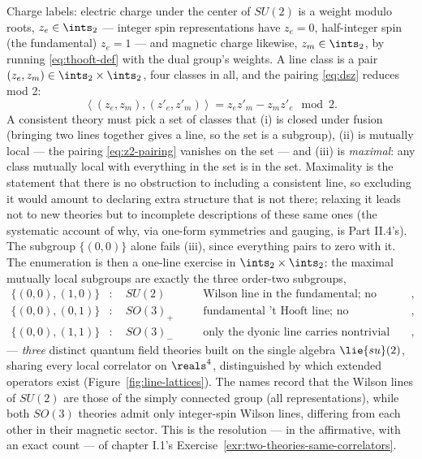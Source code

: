 Charge labels: electric charge under the center of $SU(2)$ is a weight
modulo roots, $z_e \in \ints_2$ --- integer spin representations have
$z_e = 0$, half-integer spin (the fundamental) $z_e = 1$ --- and
magnetic charge likewise, $z_m \in \ints_2$, by running
\eqref{eq:thooft-def} with the dual group's weights. A line class is a
pair $(z_e, z_m) \in \ints_2 \times \ints_2$, four classes in all, and
the pairing \eqref{eq:dsz} reduces mod 2:
\begin{equation}
\left\langle (z_e, z_m), (z'_e, z'_m)\right\rangle
= z_e z'_m - z_m z'_e \mod 2 .
\label{eq:z2-pairing}
\end{equation}
A consistent theory must pick a set of classes that (i) is closed under
fusion (bringing two lines together gives a line, so the set is a
subgroup), (ii) is mutually local --- the pairing
\eqref{eq:z2-pairing} vanishes on the set --- and (iii) is
\emph{maximal}: any class mutually local with everything in the set is
in the set. Maximality is the statement that there is no obstruction to
including a consistent line, so excluding it would amount to declaring
extra structure that is not there; relaxing it leads not to new theories
but to incomplete descriptions of these same ones (the systematic
account of why, via one-form symmetries and gauging, is Part II.4's).
The subgroup $\{(0,0)\}$ alone fails (iii), since everything pairs to
zero with it. The enumeration is then a one-line exercise in
$\ints_2\times\ints_2$: the maximal mutually local subgroups are exactly
the three order-two subgroups,
\begin{equation}
\begin{aligned}
\{(0,0), (1,0)\} &: \quad SU(2) \quad
&&\text{Wilson line in the fundamental; no fundamental 't Hooft line},\\
\{(0,0), (0,1)\} &: \quad SO(3)_+ \quad
&&\text{fundamental 't Hooft line; no fundamental Wilson line},\\
\{(0,0), (1,1)\} &: \quad SO(3)_- \quad
&&\text{only the dyonic line carries nontrivial charge},
\end{aligned}
\label{eq:three-theories}
\end{equation}
--- \emph{three} distinct quantum field theories built on the single
algebra $\lie{su}(2)$, sharing every local correlator on $\reals^4$,
distinguished by which extended operators exist
(Figure~\ref{fig:line-lattices}). The names record that the Wilson lines
of $SU(2)$ are those of the simply connected group (all
representations), while both $SO(3)$ theories admit only integer-spin
Wilson lines, differing from each other in their magnetic sector. This
is the resolution --- in the affirmative, with an exact count --- of
chapter I.1's Exercise~\ref{exr:two-theories-same-correlators}.

